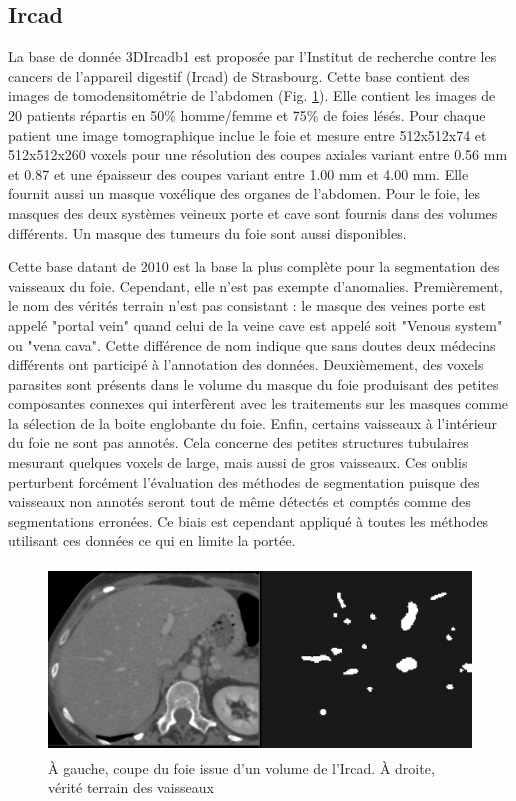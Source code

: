 \subsection{Ircad}

La base de donnée 3DIrcadb1 est proposée par l'Institut de recherche contre les cancers de l'appareil digestif (Ircad) de Strasbourg. Cette base contient des images de tomodensitométrie de l'abdomen (Fig. \ref{fig:Ircad_examples}). Elle contient les images de 20 patients répartis en 50\% homme/femme et 75\% de foies lésés. Pour chaque patient une image tomographique inclue le foie et mesure entre 512x512x74 et 512x512x260 voxels pour une résolution des coupes axiales variant entre 0.56 mm et 0.87 et une épaisseur des coupes variant entre 1.00 mm et 4.00 mm. Elle fournit aussi un masque voxélique des organes de l'abdomen. Pour le foie, les masques des deux systèmes veineux porte et cave sont fournis dans des volumes différents. Un masque des tumeurs du foie sont aussi disponibles.

Cette base datant de 2010 est la base la plus complète pour la segmentation des vaisseaux du foie. Cependant, elle n'est pas exempte d'anomalies. Premièrement, le nom des vérités terrain n'est pas consistant : le masque des veines porte est appelé "portal vein" quand celui de la veine cave est appelé soit "Venous system" ou "vena cava". Cette différence de nom indique que sans doutes deux médecins différents ont participé à l'annotation des données. Deuxièmement, des voxels parasites sont présents dans le volume du masque du foie produisant des petites composantes connexes qui interfèrent avec les traitements sur les masques comme la sélection de la boite englobante du foie. Enfin, certains vaisseaux à l'intérieur du foie ne sont pas annotés. Cela concerne des petites structures tubulaires mesurant quelques voxels de large, mais aussi de gros vaisseaux. Ces oublis perturbent forcément l'évaluation des méthodes de segmentation puisque des vaisseaux non annotés seront tout de même détectés et comptés comme des segmentations erronées. Ce biais est cependant appliqué à toutes les méthodes utilisant ces données ce qui en limite la portée.

\begin{figure}
    \centering
    \includegraphics[height=5cm]{Images/Ircad_examples.png}
    \caption{À gauche, coupe du foie issue d'un volume de l'Ircad. À droite, vérité terrain des vaisseaux}
    \label{fig:Ircad_examples}
\end{figure}


